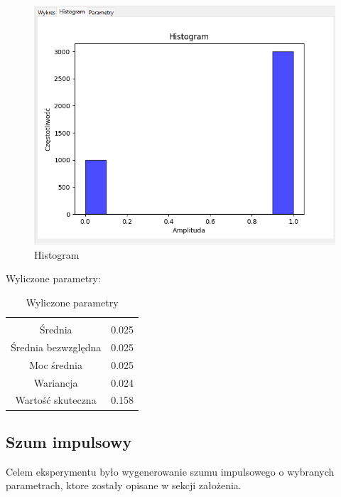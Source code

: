\documentclass{article}
\begin{document}
\begin{figure}[h!]
    \centering
    \includegraphics[width=\textwidth]{img/skok/hist.png}
    \caption{Histogram}
\end{figure}
\FloatBarrier
Wyliczone parametry:
\begin{table}[h!]
    \centering
    \vspace{0.2cm}
    \begin{tabular}{|c|c|}
        \hline\hline\\[-0.4cm]
        Średnia & 0.025  \\
        \hline
        Średnia bezwzględna & 0.025  \\
        \hline
        Moc średnia & 0.025  \\
        \hline
        Wariancja & 0.024 \\
        \hline
        Wartość skuteczna & 0.158 \\
        \hline
    \end{tabular}
    \caption{Wyliczone parametry}
    \label{impuls}
\end{table}  

\subsection{Szum impulsowy} \label{szumimpuls} 
Celem eksperymentu było wygenerowanie szumu impulsowego o wybranych parametrach,
ktore zostały opisane w sekcji założenia.
\end{document}
